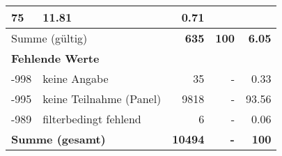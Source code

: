 \begin{longtable}{lXrrr}
       \num{75} &
       \num[round-mode=places,round-precision=2]{11,81} &
         \num[round-mode=places,round-precision=2]{0,71} \\
     \midrule
     \multicolumn{2}{l}{Summe (gültig)} &
       \textbf{\num{635}} &
     \textbf{100} &
       \textbf{\num[round-mode=places,round-precision=2]{6,05}} \\
     \multicolumn{5}{l}{\textbf{Fehlende Werte}}\\
       -998 &
       keine Angabe &
         \num{35} &
        - &
         \num[round-mode=places,round-precision=2]{0,33} \\
       -995 &
       keine Teilnahme (Panel) &
         \num{9818} &
        - &
         \num[round-mode=places,round-precision=2]{93,56} \\
       -989 &
       filterbedingt fehlend &
         \num{6} &
        - &
         \num[round-mode=places,round-precision=2]{0,06} \\
     \midrule
     \multicolumn{2}{l}{\textbf{Summe (gesamt)}} &
          \textbf{\num{10494}} &
        \textbf{-} &
        \textbf{100} \\
     \bottomrule
     \end{longtable}
     
